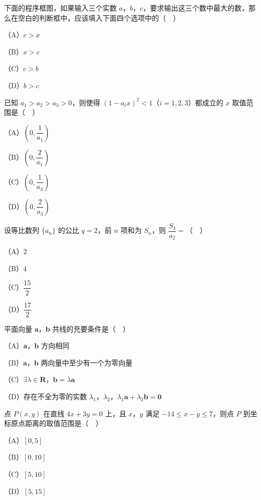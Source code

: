 \begin{question}
下面的程序框图，如果输入三个实数 $a$，$b$，$c$，要求输出这三个数中最大的数，那么在空白的判断框中，应该填入下面四个选项中的（　）

（A）$c>x$

（B）$x>c$

（C）$c>b$

（D）$b>c$
\nopagebreak[4]
\begin{center}\end{center}
\nopagebreak[4]
\end{question}
\begin{question}
已知 $a_1>a_2>a_3>0$，则使得 $(1-a_ix)^2<1$（$i=1,2,3$）都成立的 $x$ 取值范围是（　）

（A）$\left(0,\dfrac1{a_1}\right)$

（B）$\left(0,\dfrac2{a_1}\right)$

（C）$\left(0,\dfrac1{a_3}\right)$

（D）$\left(0,\dfrac2{a_3}\right)$

\end{question}
\begin{question}
设等比数列 $\{a_n\}$ 的公比 $q=2$，前 $n$ 项和为 $S_n$，则 $\dfrac{S_4}{a_2}=$（　）

（A）$2$

（B）$4$

（C）$\dfrac{15}2$

（D）$\dfrac{17}2$

\end{question}
\begin{question}
平面向量 $\boldsymbol a$，$\boldsymbol b$ 共线的充要条件是（　）

（A）$\boldsymbol a$，$\boldsymbol b$ 方向相同

（B）$\boldsymbol a$，$\boldsymbol b$ 两向量中至少有一个为零向量

（C）$\exists\lambda\in\mathbf R$，$\boldsymbol b=\lambda\boldsymbol a$

（D）存在不全为零的实数 $\lambda_1$，$\lambda_2$，$\lambda_1\boldsymbol a+\lambda_2\boldsymbol b=\boldsymbol 0$

\end{question}
\begin{question}
点 $P(x,y)$ 在直线 $4x+3y=0$ 上，且 $x$，$y$ 满足 $-14\leqslant x-y\leqslant7$，则点 $P$ 到坐标原点距离的取值范围是（　）

（A）$[0,5]$

（B）$[0,10]$

（C）$[5,10]$

（D）$[5,15]$

\end{question}
